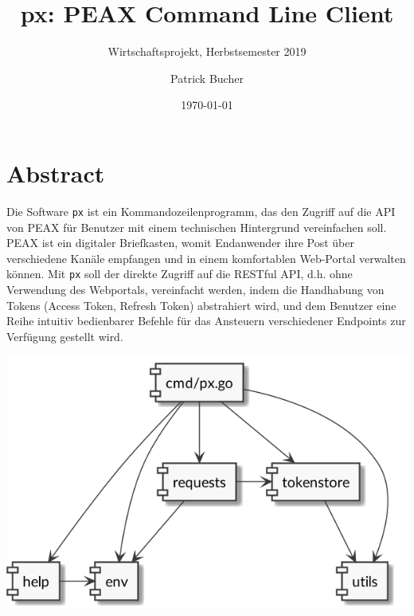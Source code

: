 \author{Patrick Bucher}
\title{px: PEAX Command Line Client}
\subtitle{Wirtschaftsprojekt, Herbstsemester 2019}
\date{\today}
\maketitle
\thispagestyle{empty}

\section*{Abstract}

Die Software \texttt{px} ist ein Kommandozeilenprogramm, das den Zugriff auf die API von PEAX für Benutzer mit einem technischen Hintergrund vereinfachen soll. PEAX ist ein digitaler Briefkasten, womit Endanwender ihre Post über verschiedene Kanäle empfangen und in einem komfortablen Web-Portal verwalten können. Mit \texttt{px} soll der direkte Zugriff auf die RESTful API, d.h. ohne Verwendung des Webportals, vereinfacht werden, indem die Handhabung von Tokens (Access Token, Refresh Token) abstrahiert wird, und dem Benutzer eine Reihe intuitiv bedienbarer Befehle für das Ansteuern verschiedener Endpoints zur Verfügung gestellt wird.

\vfill

\begin{center}
    \includegraphics[width=0.75\linewidth]{pics/title.png}
\end{center}

